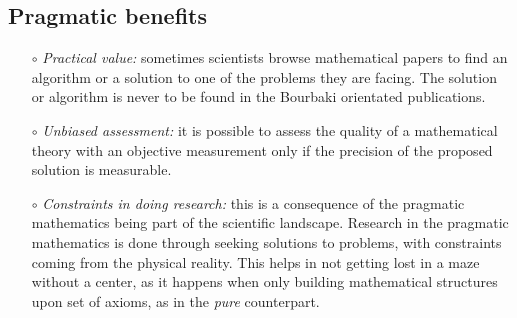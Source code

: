 \documentclass[]{scrartcl}
\theoremstyle{definition}
\begin{document}



\subsection*{Pragmatic benefits}

\begin{itemize}
    \item[$\circ$] \emph{Practical value:} sometimes scientists browse mathematical papers to find an algorithm or a solution to one of the problems they are facing. The solution or algorithm is never to be found in the Bourbaki orientated publications.
    
    \item[$\circ$] \emph{Unbiased assessment:} it is possible to assess the quality of a mathematical theory with an objective measurement only if the precision of the proposed solution is measurable.
     
    \item[$\circ$] \emph{Constraints in doing research:} this is a consequence of the pragmatic mathematics being part of the scientific landscape. Research in the pragmatic mathematics is done through seeking solutions to problems, with constraints coming from the physical reality. This helps in not getting lost in a maze without a center, as it happens when only building mathematical structures upon set of axioms, as in the \emph{pure} counterpart.
      
\end{itemize}
\end{document}
